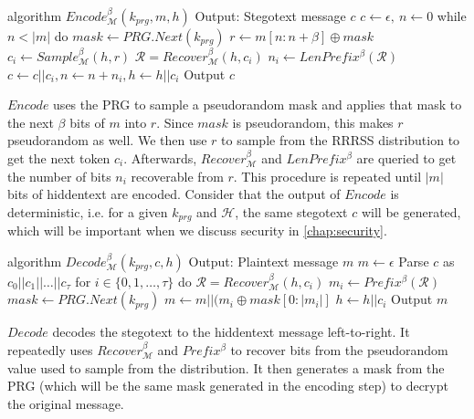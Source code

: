 \begin{Pseudocode}[caption={Meteor Encode Algorithm, \cite{Meteor2021}}, label={alg:encode}]
algorithm $Encode_{\mathcal{M}}^\beta(k_{prg}, m, h)$
	Output: Stegotext message $c$
	$c \leftarrow \epsilon,~ n \leftarrow 0$
	while $n < |m|$ do
		$mask \leftarrow PRG.Next(k_{prg})$
		$r \leftarrow m[n:n+\beta] \oplus mask$
		$c_i \leftarrow Sample_{\mathcal{M}}^\beta(h, r)$
		$\mathcal{R} = Recover_{\mathcal{M}}^\beta(h, c_i)$
		$n_i \leftarrow LenPrefix^\beta(\mathcal{R})$
		$c \leftarrow c || c_i, n \leftarrow n+n_i, h \leftarrow h||c_i$
	Output $c$
\end{Pseudocode}

$Encode$ uses the PRG to sample a pseudorandom mask and applies that mask to the next $\beta$ bits of $m$ into $r$.
Since $mask$ is pseudorandom, this makes $r$ pseudorandom as well.
We then use $r$ to sample from the RRRSS distribution to get the next token $c_i$.
Afterwards, $Recover_{\mathcal{M}}^\beta$ and $LenPrefix^\beta$ are queried to get the number of bits $n_i$ recoverable from $r$.
This procedure is repeated until $|m|$ bits of hiddentext are encoded.
Consider that the output of $Encode$ is deterministic, i.e. for a given $k_{prg}$ and $\mathcal{H}$, the same stegotext $c$ will be generated, which will be important when we discuss security in \autoref{chap:security}.


\begin{Pseudocode}[float, caption={Meteor Decode Algorithm, \cite{Meteor2021}}, label={alg:decode}]
algorithm $Decode_{\mathcal{M}}^\beta(k_{prg}, c, h)$
	Output: Plaintext message $m$
	$m \leftarrow \epsilon$
	Parse $c$ as $c_0 || c_1 || \dots || c_{\tau}$
	for $i \in \{ 0, 1, \dots, \tau \}$ do
		$\mathcal{R} = Recover_{\mathcal{M}}^\beta(h, c_i)$
		$m_i \leftarrow Prefix^\beta(\mathcal{R})$
		$mask \leftarrow PRG.Next(k_{prg})$
		$m \leftarrow m || (m_i \oplus mask[0: |m_i|]$
		$h \leftarrow h||c_i$
	Output $m$
\end{Pseudocode}

$Decode$ decodes the stegotext to the hiddentext message left-to-right. 
It repeatedly uses $Recover_{\mathcal{M}}^\beta$ and $Prefix^\beta$ to recover bits from the pseudorandom value used to sample from the distribution.
It then generates a mask from the PRG (which will be the same mask generated in the encoding step) to decrypt the original message.

